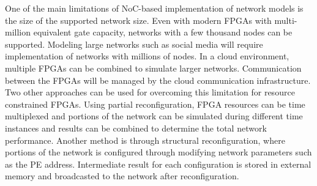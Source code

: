 One of the main limitations of NoC-based implementation of network models is the size of the supported network size.
Even with modern FPGAs with multi-million equivalent gate capacity, networks with a few thousand nodes can be supported.
Modeling large networks such as social media will require implementation of networks with millions of nodes.
In a cloud environment, multiple FPGAs can be combined to simulate larger networks.
Communication between the FPGAs will be managed by the cloud communication infrastructure.
Two other approaches can be used for overcoming this limitation for resource constrained FPGAs.  
Using partial reconfiguration, FPGA resources can be time multiplexed and portions of the network can be simulated during different time instances and results can be combined to determine the total network performance.
Another method is through structural reconfiguration, where portions of the network is configured through modifying network parameters such as the PE address.
Intermediate result for each configuration is stored in external memory and broadcasted to the network after reconfiguration.
 